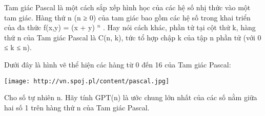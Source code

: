 Tam giác Pascal là một cách sắp xếp hình học của các hệ số nhị thức vào một tam giác. Hàng thứ n (n ≥ 0) của tam giác bao gồm các hệ số trong khai triển của đa thức f(x,y) = (x + y)   $^    n   $   . Hay nói cách khác, phần tử tại cột thứ k, hàng thứ n của Tam giác Pascal là C(n, k), tức tổ hợp chập k của tập n phần tử (với 0 ≤ k ≤ n).  

   Dưới đây là hình vẽ thể hiện các hàng từ 0 đến 16 của Tam giác Pascal:  


\texttt{[image: http://vn.spoj.pl/content/pascal.jpg]}



   Cho số tự nhiên n. Hãy tính GPT(n) là ước chung lớn nhất của các số nằm giữa hai số 1 trên hàng thứ n của Tam giác Pascal.